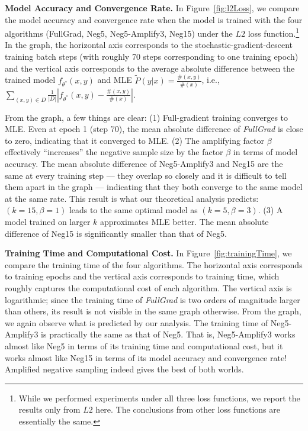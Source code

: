 \textbf{Model Accuracy and Convergence Rate.} 
In Figure~\ref{fig:l2Loss}, we compare the model accuracy and convergence rate when the model is trained with the four algorithms (FullGrad, Neg5, Neg5-Amplify3, Neg15) under the $L2$ loss function.\footnote{While we performed experiments under all three loss functions, we report the results only from $L2$ here. The conclusions from other loss functions are essentially the same.} In the graph, the horizontal axis corresponds to the stochastic-gradient-descent training batch steps (with roughly 70 steps corresponding to one training epoch) and the vertical axis corresponds to the average absolute difference between the trained model $f_{\theta^*}(x, y)$ and MLE $\tilde{P}(y|x) = \frac{\#(x,y)}{\#(x)}$, i.e., $\sum_{(x,y)\in D} \frac{1}{\vert D\vert}\left\vert f_{\theta^*}(x, y) - \frac{\#(x,y)}{\#(x)}\right\vert$. 

From the graph, a few things are clear: (1) Full-gradient training converges to MLE. Even at epoch 1 (step 70), the mean absolute difference of \emph{FullGrad} is close to zero, indicating that it converged to MLE. (2) The amplifying factor $\beta$ effectively ``increases'' the negative sample size by the factor $\beta$ in terms of model accuracy. The mean absolute difference of Neg5-Amplify3 and Neg15 are the same at every training step --- they overlap so closely and it is difficult to tell them apart in the graph --- indicating that they both converge to the same model at the same rate. This result is what our theoretical analysis predicts: $(k=15, \beta = 1)$ leads to the same optimal model as $(k=5, \beta=3)$. (3) A model trained on larger $k$ approximates MLE better. The mean absolute difference of Neg15 is significantly smaller than that of Neg5. 

\textbf{Training Time and Computational Cost.} In Figure~\ref{fig:trainingTime}, we compare the training time of the four algorithms. The horizontal axis corresponds to training epochs and the vertical axis corresponds to training time, which roughly captures the computational cost of each algorithm. The vertical axis is logarithmic; since the training time of \emph{FullGrad} is two orders of magnitude larger than others, its result is not visible in the same graph otherwise. From the graph, we again observe what is predicted by our analysis. The training time of Neg5-Amplify3 is practically the same as that of Neg5. That is, Neg5-Amplify3 works almost like Neg5 in terms of its training time and computational cost, but it works almost like  Neg15 in terms of its model accuracy and convergence rate! Amplified negative sampling indeed gives the best of both worlds.

